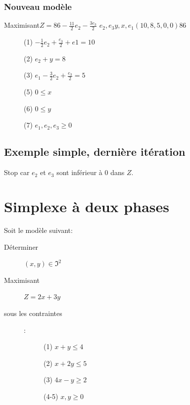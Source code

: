 \subsection{Nouveau modèle}
        {Maximisant}{$Z = 86 - \frac{11}{2}e_2 - \frac{3e_3}{2}$}
        {$e_2,e_3$}{$y,x,e_1$}{$(10,8,5,0,0)$}{$86$}
        {\begin{description}
\item[] (1) $- \frac{1}{2}e_2 + \frac{e_3}{2} + e1 = 10$
\item[] (2) $e_2 + y = 8$
\item[] (3) $e_1 - \frac{3}{2}e_2 + \frac{e_3}{2} = 5$
\item[] (5) $ 0 \leq x$
\item[] (6) $ 0 \leq y$
\item[] (7) $ e_1,e_2,e_3 \geq 0$
\end{description}
}
\section{Exemple simple, dernière itération}
Stop car $e_2$ et $e_3$ sont inférieur à 0 dans $Z$.

\chapter{Simplexe à deux phases}
Soit le modèle suivant:
\begin{description}
\item[Déterminer] $(x,y) \in \Im^2$
\item[Maximisant] $Z = 2x + 3y$
\item[sous les contraintes]:
\begin{description}
\item[] (1) $x + y \leqslant 4$
\item[] (2) $x + 2y \leqslant 5$
\item[] (3) $4x -y \geqslant 2$
\item[] (4-5) $x,y \geqslant 0$
\end{description}
\end{description}

